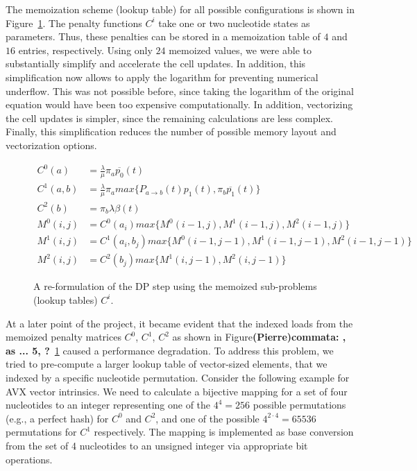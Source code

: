 \documentclass[runningheads,a4paper]{llncs}
\begin{document}
The memoization scheme (lookup table) for all possible configurations is shown in Figure~\ref{fig:memo}. 
The penalty functions $C^i$ take one or two nucleotide states as parameters.
Thus, these penalties can be stored in a memoization table of $4$ and $16$ entries, respectively. 
Using only $24$ memoized values, we were able to substantially simplify and accelerate the cell updates.
In addition, this simplification now allows to apply the logarithm for preventing numerical underflow.
This was not possible before, since taking the logarithm of the original equation would have been too expensive computationally. 
In addition, vectorizing the cell updates is simpler, since the remaining calculations are less complex. 
Finally, this simplification reduces the number of possible memory layout and vectorization options.

\begin{figure}
\[
\begin{aligned}
  C^0(a)&=\frac{\lambda}{\mu}\pi_{a}\overline{p_0}(t)\\
  C^1(a, b)&=\frac{\lambda}{\mu}\pi_{a}max\{P_{a \rightarrow b}(t) p_1(t), \pi_{b}\overline{p_1}(t)\}\\
  C^2(b)&=\pi_{b}\lambda\beta(t)\\
  M^0(i,j)&=C^0(a_i)max\{M^0(i-1, j), M^1(i-1,j), M^2(i-1,j)\}\\
  M^1(i,j)&=C^1(a_i,b_j)max\{M^0(i-1, j-1), M^1(i-1,j-1), M^2(i-1,j-1)\}\\
  M^2(i,j)&=C^2(b_j)max\{M^1(i,j-1), M^2(i,j-1)\}
\end{aligned}
\]
\caption{A re-formulation of the DP step using the memoized sub-problems (lookup tables) $C^i$.}
\label{fig:memo}
\end{figure}

At a later point of the project, it became evident that the indexed loads from the memoized penalty matrices $C^0$, $C^1$, $C^2$ as shown in Figure\textbf{(Pierre)commata: , as ... 5, ?}~\ref{fig:memo} 
caused a performance degradation. 
To address this problem, we tried to pre-compute a larger lookup table of vector-sized elements, that we indexed by a specific nucleotide permutation. 
Consider the following example for AVX vector intrinsics.
We need to calculate a bijective mapping for a set of four nucleotides to an integer representing one of the $4^4 = 256$ possible permutations (e.g., a perfect hash) 
for $C^0$ and $C^2$, and one of the possible $4^{2 \cdot 4} = 65536$ permutations for $C^1$ respectively. 
The mapping is implemented as base conversion from the set of 4 nucleotides to an unsigned integer via appropriate bit operations.
\end{document}
